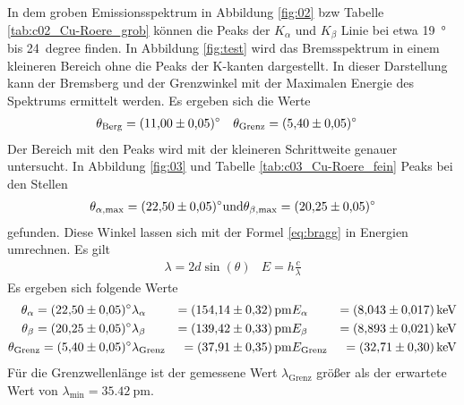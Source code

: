 In dem groben Emissionsspektrum in Abbildung \ref{fig:02} bzw Tabelle \ref{tab:c02_Cu-Roere_grob} können die
Peaks der $K_\alpha$ und $K_\beta$ Linie bei etwa \qty{19}{\degree} bis
\qty{24}{degree} finden.
In Abbildung \ref{fig:test} wird das Bremsspektrum in einem kleineren Bereich ohne die Peaks der K-kanten dargestellt.
In dieser Darstellung kann der Bremsberg und der Grenzwinkel mit der Maximalen Energie des Spektrums ermittelt werden.
Es ergeben sich die Werte
\begin{align*}
    \theta_\text{Berg}  &= \qty{11.0 \pm 0.05}{\degree} &
    \theta_\text{Grenz} &= \qty{5.4  \pm 0.05}{\degree} 
\end{align*} 
Der Bereich mit den Peaks wird mit der kleineren Schrittweite genauer untersucht.
In Abbildung \ref{fig:03} und Tabelle \ref{tab:c03_Cu-Roere_fein} Peaks bei den Stellen 
\begin{align}
    \theta_{\alpha,\text{max}} = \qty{22.50 \pm 0.05}{\degree} \text{und}
    \theta_{\beta, \text{max}}= \qty{ 20.25 \pm 0.05}{\degree}
\end{align}
gefunden.
Diese Winkel lassen sich mit der Formel \eqref{eq:bragg} in Energien umrechnen.
Es gilt
\begin{align*}
    \lambda = 2 d \sin(\theta) & E = h \frac{c}{\lambda}
\end{align*}
Es ergeben sich folgende Werte 
\begin{align*}
    \theta_\alpha        = \qty{22.50 \pm 0.05}{\degree} & \lambda_\alpha      &= \qty{154.14 \pm 0.32}{\pico\meter}  & E_\alpha       &= \qty{8.043 \pm 0.017}{\kilo\eV}  \\
    \theta_\beta         = \qty{20.25 \pm 0.05}{\degree} & \lambda_\beta       &= \qty{139.42 \pm 0.33}{\pico\meter}  & E_\beta        &= \qty{8.893 \pm 0.021}{\kilo\eV}  \\
    \theta_\text{Grenz}  = \qty{5.4 \pm 0.05}{\degree} & \lambda_\text{Grenz}  &= \qty{37.91 \pm 0.35}{\pico\meter}  & E_\text{Grenz}  &= \qty{32.71 \pm 0.30}{\kilo\eV}   
\end{align*}
Für die Grenzwellenlänge ist der gemessene Wert $\lambda_\text{Grenz}$ größer als der erwartete Wert von $\lambda_\text{min}= \qty{35.42}{\pico\m}$.

